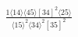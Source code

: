 \documentclass[varwidth, border=5pt]{standalone}
\begin{document}
\begin{my}
$\begin{gathered}
\scriptscriptstyle\frac{1⟨14⟩⟨45⟩[34]^2⟨25⟩}{⟨15⟩^2⟨34⟩^2[35]^2}
\end{gathered}$
\end{my}
\end{document}
